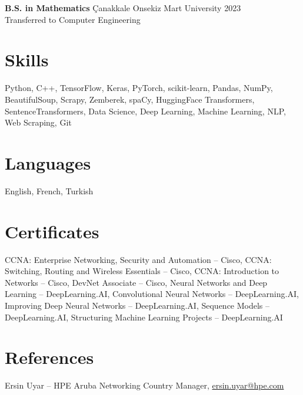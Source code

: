 \documentclass[10.8pt]{article} %
\begin{document}
\textbf{B.S. in Mathematics} \hfill Çanakkale Onsekiz Mart University \hfill 2023 \\
Transferred to Computer Engineering


\section*{Skills}
Python, C++, TensorFlow, Keras, PyTorch, scikit-learn, Pandas, NumPy, BeautifulSoup, Scrapy, Zemberek, spaCy, HuggingFace Transformers, SentenceTransformers, Data Science, Deep Learning, Machine Learning, NLP, Web Scraping, Git

\section*{Languages}
English, French, Turkish

\section*{Certificates}
CCNA: Enterprise Networking, Security and Automation – Cisco, 
CCNA: Switching, Routing and Wireless Essentials – Cisco, 
CCNA: Introduction to Networks – Cisco, 
DevNet Associate – Cisco, 
Neural Networks and Deep Learning – DeepLearning.AI, 
Convolutional Neural Networks – DeepLearning.AI, 
Improving Deep Neural Networks – DeepLearning.AI, 
Sequence Models – DeepLearning.AI, 
Structuring Machine Learning Projects – DeepLearning.AI

\section*{References}
Ersin Uyar – HPE Aruba Networking Country Manager, \href{mailto:ersin.uyar@hpe.com}{ersin.uyar@hpe.com}
\end{document}

